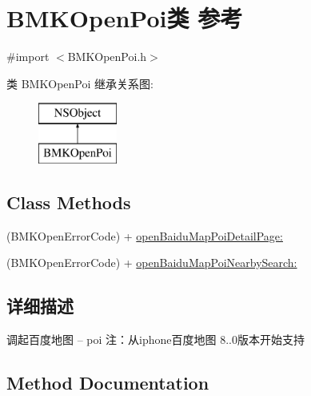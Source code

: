 \hypertarget{interface_b_m_k_open_poi}{}\section{B\+M\+K\+Open\+Poi类 参考}
\label{interface_b_m_k_open_poi}


{\ttfamily \#import $<$B\+M\+K\+Open\+Poi.\+h$>$}

类 B\+M\+K\+Open\+Poi 继承关系图\+:\begin{figure}[H]
\begin{center}
\leavevmode
\includegraphics[height=2.000000cm]{interface_b_m_k_open_poi}
\end{center}
\end{figure}
\subsection*{Class Methods}
\begin{DoxyCompactItemize}
\item 
(B\+M\+K\+Open\+Error\+Code) + \hyperlink{interface_b_m_k_open_poi_a4dae182974fb6f89ede8684be6e52884}{open\+Baidu\+Map\+Poi\+Detail\+Page\+:}
\item 
(B\+M\+K\+Open\+Error\+Code) + \hyperlink{interface_b_m_k_open_poi_ae1e2f58f74e1d06fab791d0464d749fb}{open\+Baidu\+Map\+Poi\+Nearby\+Search\+:}
\end{DoxyCompactItemize}


\subsection{详细描述}
调起百度地图 -- poi 注：从iphone百度地图 8..\+0版本开始支持 

\subsection{Method Documentation}
\hypertarget{interface_b_m_k_open_poi_a4dae182974fb6f89ede8684be6e52884}{}
